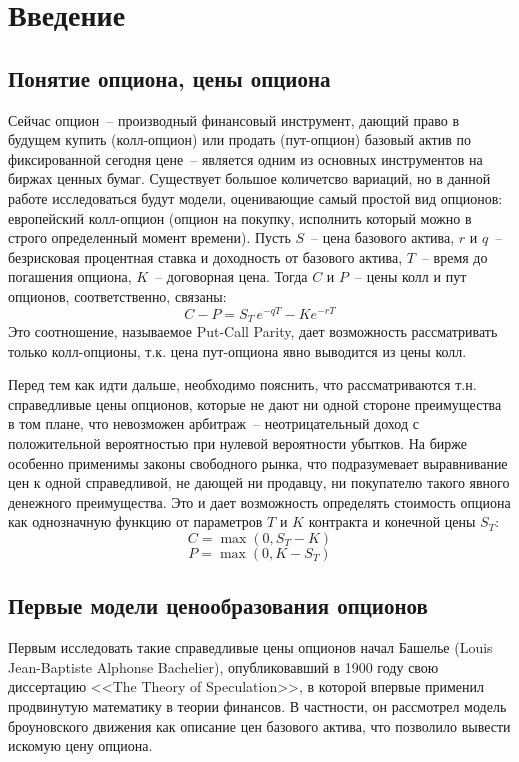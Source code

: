 \documentclass[oneside, final, 12pt, a4paper]{article}
\begin{document}
\newpage
\section{Введение}
\subsection{Понятие опциона, цены опциона}
Сейчас опцион~-- производный финансовый инструмент, дающий право в будущем купить (колл-опцион) или продать (пут-опцион) базовый актив по фиксированной сегодня цене~-- является одним из основных инструментов на биржах ценных бумаг. Существует большое количетсво вариаций, но в данной работе исследоваться будут модели, оценивающие самый простой вид опционов: европейский колл-опцион (опцион на покупку, исполнить который можно в строго определенный момент времени). Пусть $S$~-- цена базового актива, $r$ и $q$~-- безрисковая процентная ставка и доходность от базового актива, $T$~-- время до погашения опциона, $K$~-- договорная цена. Тогда $C$ и $P$~-- цены колл и пут опционов, соответственно, связаны: 
\[ C-P = S_T\,e^{-qT} - Ke^{-rT} \]
Это соотношение, называемое Put-Call Parity, дает возможность рассматривать только колл-опционы, т.к. цена пут-опциона явно выводится из цены колл. \par
Перед тем как идти дальше, необходимо пояснить, что рассматриваются т.н. справедливые цены опционов, которые не дают ни одной стороне преимущества в том плане, что невозможен арбитраж~-- неотрицательный доход с положительной вероятностью при нулевой вероятности убытков. На бирже особенно применимы законы свободного рынка, что подразумевает выравнивание цен к одной справедливой, не дающей ни продавцу, ни покупателю такого явного денежного преимущества. Это и дает возможность определять стоимость опциона как однозначную функцию от параметров $T$ и $K$ контракта и конечной цены $S_T$:
\[ C = \max(0, S_T - K) \]
\[ P = \max(0, K - S_T) \]

\subsection{Первые модели ценообразования опционов}
Первым исследовать такие справедливые цены опционов начал Башелье (Louis Jean-Baptiste Alphonse Bachelier), опубликовавший в 1900 году свою диссертацию <<The Theory of Speculation>>, в которой впервые применил продвинутую математику в теории финансов. В частности, он рассмотрел модель броуновского движения как описание цен базового актива, что позволило вывести искомую цену опциона.
\end{document}
